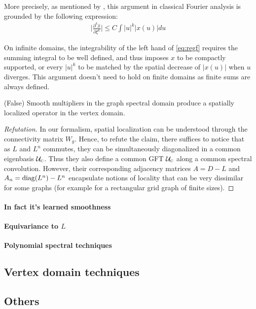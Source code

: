More precisely, as mentioned by \cite{henaff2015deep}, this argument in classical Fourier analysis is grounded by the following expression:
\begin{gather}
\bigg|\frac{\partial^k{\hat{x}}}{\partial{\xi^k}}\bigg| \leq C \int |u|^k|x(u)|du \label{eq:regf}
\end{gather}

On infinite domains, the integrability of the left hand of \eqref{eq:regf} requires the summing integral to be well defined, and thus imposes $x$ to be compactly supported, or every $|u|^k$ to be matched by the spatial decrease of $|x(u)|$ when $u$ diverges. This argument doesn't need to hold on finite domains as finite sums are always defined.

\begin{claim} (False) Smooth multipliers in the graph spectral domain produce a spatially localized operator in the vertex domain.
\end{claim}

\begin{proof}[Refutation] In our formalism, spatial localization can be understood through the connectivity matrix $W_g$. Hence, to refute the claim, there suffices to notice that as $L$ and $L^n$ commutes, they can be simultaneously diagonalized in a common eigenbasis $\mathcal{U}_{\operatorname{\textsc{c}}}$. Thus they also define a common GFT \wrt $\mathcal{U}_{\operatorname{\textsc{c}}}$ along a common spectral convolution. However, their corresponding adjacency matrices $A = D - L$ and $A_n = \operatorname{diag}(L^n) - L^n$ encapsulate notions of locality that can be very dissimilar for some graphs (for example for a rectangular grid graph of finite sizes).
\end{proof}

\paragraph{In fact it's learned smoothness}

\paragraph{Equivariance to $L$}

\todo{}

\paragraph{Polynomial spectral techniques}


\subsection{Vertex domain techniques}

\subsection{Others}

